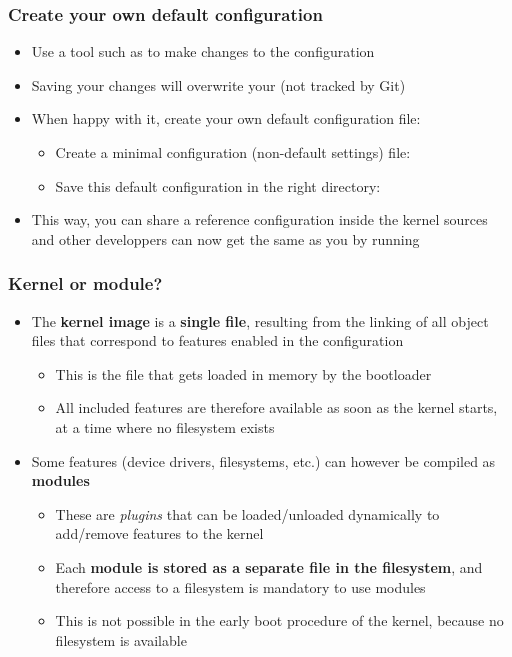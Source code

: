 \begin{frame}
  \frametitle{Create your own default configuration}
  \begin{itemize}
    \item Use a tool such as  to make changes to
      the configuration
    \item Saving your changes will overwrite your  (not
      tracked by Git)
    \item When happy with it, create your own default configuration file:
      \begin{itemize}
      \item Create a minimal configuration (non-default settings) file:\\
      \item Save this default configuration in the right directory:\\
      \end{itemize}
    \item This way, you can share a reference configuration inside
      the kernel sources and other developpers can now get the same
       as you by running 
  \end{itemize}
\end{frame}

\begin{frame}
  \frametitle{Kernel or module?}
  \begin{itemize}
  \item The {\bf kernel image} is a {\bf single file}, resulting from
    the linking of all object files that correspond to features
    enabled in the configuration
    \begin{itemize}
    \item This is the file that gets loaded in memory by the
      bootloader
    \item All included features are therefore available as soon as the
      kernel starts, at a time where no filesystem exists
    \end{itemize}
  \item Some features (device drivers, filesystems, etc.) can however
    be compiled as {\bf modules}
    \begin{itemize}
    \item These are {\em plugins} that can be loaded/unloaded dynamically to
      add/remove features to the kernel
    \item Each {\bf module is stored as a separate file in the
        filesystem}, and therefore access to a filesystem is mandatory
      to use modules
    \item This is not possible in the early boot procedure of the
      kernel, because no filesystem is available
    \end{itemize}
  \end{itemize}
\end{frame}

